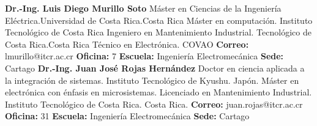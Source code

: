 \documentclass[letterpaper]{article}%
\newenvironment{textoMargen}
    {%
    \begin{list}{}{%
        \setlength{\leftmargin}{3.6cm}%
        \setlength{\rightmargin}{1.1cm}%
    }%
    \item[]%
  }
  {%
    \end{list}%
  }
\begin{document}
\vspace*{-4mm}\begin{textoMargen}\textbf{Dr.{-}Ing. Luis Diego Murillo Soto} \vspace*{2mm} \newline Máster en Ciencias de la Ingeniería Eléctrica.Universidad de Costa Rica.Costa Rica \vspace*{1mm} \newline Máster en computación. Instituto Tecnológico de Costa Rica  \vspace*{1mm} \newline Ingeniero en Mantenimiento Industrial. Tecnológico de Costa Rica.Costa Rica \vspace*{1mm} \newline Técnico en Electrónica. COVAO \vspace*{1mm} \newline \textbf{Correo:} lmurillo@itcr.ac.cr\textbf{  Oficina:} 7 \vspace*{1mm} \newline \textbf{Escuela:} Ingeniería Electromecánica\textbf{  Sede:} Cartago \vspace*{4mm} \newline \textbf{Dr.{-}Ing. Juan José Rojas Hernández} \vspace*{2mm} \newline Doctor en ciencia aplicada a la integración de sistemas. Instituto Tecnológico de Kyushu. Japón. \vspace*{1mm} \newline Máster en electrónica con énfasis en microsistemas. Licenciado en Mantenimiento Industrial. Instituto Tecnológico de Costa Rica. Costa Rica. \vspace*{1mm} \newline \textbf{Correo:} juan.rojas@itcr.ac.cr\textbf{  Oficina:} 31 \vspace*{1mm} \newline \textbf{Escuela:} Ingeniería Electromecánica\textbf{  Sede:} Cartago \vspace*{4mm} \newline \end{textoMargen}%
\end{document}
